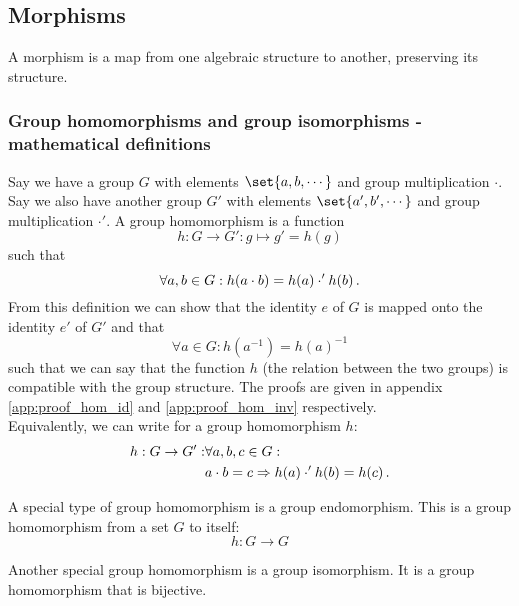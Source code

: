 \subsection{Morphisms}
    A morphism is a map from one algebraic structure to another, preserving its structure.

    \subsubsection{Group homomorphisms and group isomorphisms - mathematical definitions}
        Say we have a group $G$ with elements $\set{a, b, \cdots}$ and group multiplication $\cdot$. Say we also have another group $G'$ with elements $\set{a', b', \cdots}$ and group multiplication $\cdot'$. A group homomorphism is a function
        \begin{equation}
           h: G \rightarrow G': g \mapsto g' = h(g)
        \end{equation}
        such that
        \begin{equation}
           \forall a, b \in G: h(a \cdot b) = h(a) \cdot' h(b) \thinspace .
        \end{equation}
        From this definition we can show that the identity $e$ of $G$ is mapped onto the identity $e'$ of $G'$ and that
        \begin{equation}
           \forall a \in G: h(a^{-1}) = h(a)^{-1}
        \end{equation}
        such that we can say that the function $h$ (the relation between the two groups) is compatible with the group structure. The proofs are given in appendix \ref{app:proof_hom_id} and \ref{app:proof_hom_inv} respectively. \\

        Equivalently, we can write for a group homomorphism $h$:
        \begin{align}
            h: G \rightarrow G': &\forall a, b, c \in G: \\
            &a \cdot b = c \Rightarrow h(a) \cdot' h(b) = h(c) \thinspace .
        \end{align}

        A special type of group homomorphism is a group endomorphism. This is a group homomorphism from a set $G$ to itself:
        \begin{equation}
            h: G \rightarrow G
        \end{equation}

        Another special group homomorphism is a group isomorphism. It is a group homomorphism that is bijective. \\

